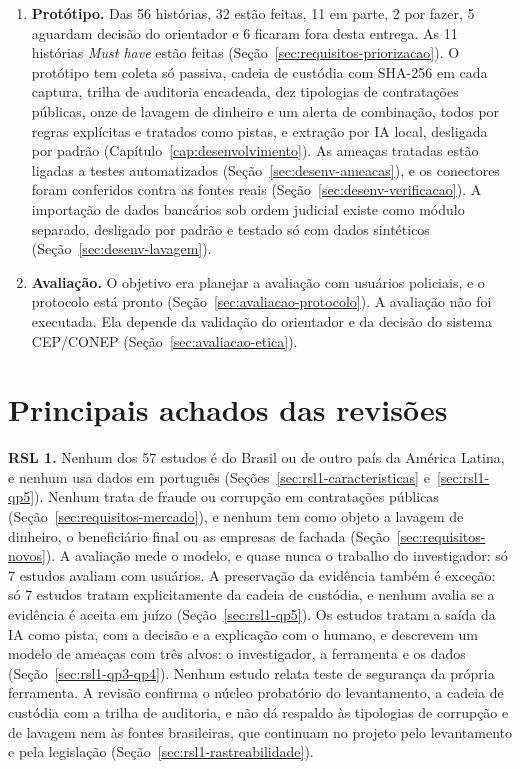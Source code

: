 \begin{enumerate}
	elas no domínio deste trabalho e o que falta ao protótipo, organizado em
	três horizontes do \textit{backlog}.
	\item \textbf{Protótipo.} Das 56 histórias, 32 estão feitas, 11 em
	parte, 2 por fazer, 5 aguardam decisão do orientador e 6 ficaram fora
	desta entrega. As 11 histórias \textit{Must have} estão feitas
	(Seção~\ref{sec:requisitos-priorizacao}). O protótipo tem coleta só
	passiva, cadeia de custódia com SHA-256 em cada captura, trilha de
	auditoria encadeada, dez tipologias de contratações públicas, onze de
	lavagem de dinheiro e um alerta de combinação, todos por regras
	explícitas e tratados como pistas, e extração por IA local, desligada por
	padrão (Capítulo~\ref{cap:desenvolvimento}). As ameaças tratadas estão
	ligadas a testes automatizados (Seção~\ref{sec:desenv-ameacas}), e os
	conectores foram conferidos contra as fontes reais
	(Seção~\ref{sec:desenv-verificacao}). A importação de dados bancários
	sob ordem judicial existe como módulo separado, desligado por padrão e
	testado só com dados sintéticos (Seção~\ref{sec:desenv-lavagem}).
	\item \textbf{Avaliação.} O objetivo era planejar a avaliação com
	usuários policiais, e o protocolo está pronto
	(Seção~\ref{sec:avaliacao-protocolo}). A avaliação não foi executada. Ela
	depende da validação do orientador e da decisão do sistema CEP/CONEP
	(Seção~\ref{sec:avaliacao-etica}).
\end{enumerate}

\section{Principais achados das revisões}
\label{sec:consideracoes-achados}

\textbf{RSL 1.} Nenhum dos 57 estudos é do Brasil ou de outro país da
América Latina, e nenhum usa dados em português
(Seções~\ref{sec:rsl1-caracteristicas} e~\ref{sec:rsl1-qp5}). Nenhum trata de
fraude ou corrupção em contratações públicas
(Seção~\ref{sec:requisitos-mercado}), e nenhum tem como objeto a lavagem de
dinheiro, o beneficiário final ou as empresas de fachada
(Seção~\ref{sec:requisitos-novos}). A avaliação mede o modelo, e quase
nunca o trabalho do investigador: só 7 estudos avaliam com usuários. A
preservação da evidência também é exceção: só 7 estudos tratam
explicitamente da cadeia de custódia, e nenhum avalia se a evidência é
aceita em juízo (Seção~\ref{sec:rsl1-qp5}). Os estudos tratam a saída da IA
como pista, com a decisão e a explicação com o humano, e descrevem um modelo
de ameaças com três alvos: o investigador, a ferramenta e os dados
(Seção~\ref{sec:rsl1-qp3-qp4}). Nenhum estudo relata teste de segurança da
própria ferramenta. A revisão confirma o núcleo probatório do levantamento,
a cadeia de custódia com a trilha de auditoria, e não dá respaldo às
tipologias de corrupção e de lavagem nem às fontes brasileiras, que continuam no projeto
pelo levantamento e pela legislação (Seção~\ref{sec:rsl1-rastreabilidade}).

